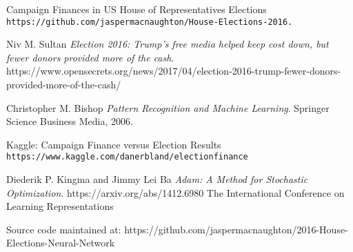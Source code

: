 \documentclass[11pt]{scrartcl} %
\begin{document}
\medskip
 
\begin{thebibliography}{9}

Campaign Finances in US House of Representatives Elections
\\\texttt{https://github.com/jaspermacnaughton/House-Elections-2016.}

Niv M. Sultan
\textit{Election 2016: Trump’s free media helped keep cost down, but fewer donors provided more of the cash}. 
https://www.opensecrets.org/news/2017/04/election-2016-trump-fewer-donors-provided-more-of-the-cash/

Christopher M. Bishop
\textit{Pattern Recognition and Machine Learning}. 
Springer Science Business Media, 2006.

Kaggle: Campaign Finance versus Election Results
\\\texttt{https://www.kaggle.com/danerbland/electionfinance}

Diederik P. Kingma and Jimmy Lei Ba
\textit{Adam: A Method for Stochastic Optimization}. 
https://arxiv.org/abs/1412.6980
The International Conference on Learning Representations


\end{thebibliography}


Source code maintained at: https://github.com/jaspermacnaughton/2016-House-Elections-Neural-Network
\end{document}
